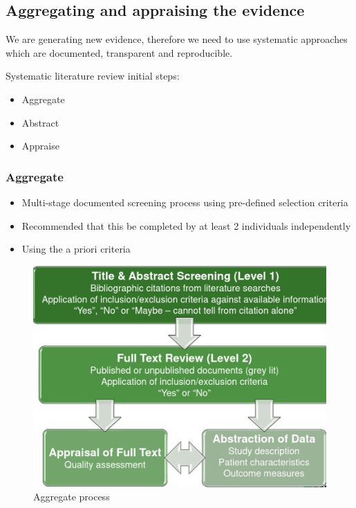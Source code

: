\documentclass[
]{book}
\providecommand{\tightlist}{%
  \setlength{\itemsep}{0pt}\setlength{\parskip}{0pt}}
\begin{document}
\hypertarget{aggregating-and-appraising-the-evidence}{%
\subsection{Aggregating and appraising the evidence}\label{aggregating-and-appraising-the-evidence}}

We are generating new evidence, therefore we need to use systematic approaches which are documented, transparent and reproducible.

Systematic literature review initial steps:

\begin{itemize}
\tightlist
\item
  Aggregate
\item
  Abstract
\item
  Appraise
\end{itemize}

\hypertarget{aggregate}{%
\subsubsection{Aggregate}\label{aggregate}}

\begin{itemize}
\tightlist
\item
  Multi-stage documented screening process using pre-defined selection criteria
\item
  Recommended that this be completed by at least 2 individuals independently
\item
  Using the a priori criteria
\end{itemize}

\begin{figure}

{\centering \includegraphics[width=13.69in]{images/review} 

}

\caption{Aggregate process}\label{fig:unnamed-chunk-2}
\end{figure}
\end{document}
